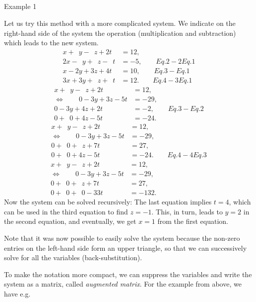 \documentclass[
  letterpaper,
  DIV=11,
  numbers=noendperiod]{scrartcl}
\makeatletter
\let\oldsubparagraph\subparagraph
\renewcommand{\subparagraph}{
    \@ifstar
      \xxxSubParagraphStar
      \xxxSubParagraphNoStar
  }
\newcommand{\xxxSubParagraphStar}[1]{\oldsubparagraph*{#1}\mbox{}}
\newcommand{\xxxSubParagraphNoStar}[1]{\oldsubparagraph{#1}\mbox{}}
\theoremstyle{remark}
\makeatother
\begin{document}
\subparagraph{Example 1}\label{example-1-1}

Let us try this method with a more complicated system. We indicate on
the right-hand side of the system the operation (multiplication and
subtraction) which leads to the new system. \[\begin{aligned}
 x+\phantom{2}y-\phantom{2}z+2t &= 12,\\
 2x-\phantom{2}y+\phantom{2}z-\phantom{2}t &=-5,    \qquad Eq. 2- 2 Eq. 1\\
 x-2y+3z+4t &= 10, \qquad Eq. 3-  Eq. 1\\ 
 3x+3y+\phantom{2}z+\phantom{2}t &= 12. \qquad Eq. 4- 3 Eq. 1
\end{aligned}\] \[\begin{aligned}
 x+\phantom{2}y-\phantom{2}z+2t &= 12,\\
\Leftrightarrow \qquad  0 - 3 y +3 z- 5 t &=-29,    \qquad  \\
 0-3y+4z+2t &= -2, \qquad Eq. 3-  Eq. 2\\ 
 0+\phantom{2}0 +4 z -5 t &= -24. 
\end{aligned}\] \[\begin{aligned}
 x+\phantom{2}y-\phantom{2}z+2t &= 12,\\
\Leftrightarrow \qquad  0 - 3 y +3 z- 5 t &=-29,    \qquad  \\
 0 + \phantom{2}0 + \phantom{1} z+7t &= 27,\\ 
 0+\phantom{2}0 +4 z -5 t &= -24.  \qquad  Eq.4- 4 Eq. 3
\end{aligned}\] \[\begin{aligned}
 x+\phantom{2}y-\phantom{2}z+2t &= 12,\\
\Leftrightarrow \qquad   0 - 3 y +3 z- 5 t &=-29,    \qquad  \phantom{Eq.4- 4 Eq. 3} \\
 0 + \phantom{2}0 + \phantom{1} z+7t &= 27,\\ 
 0+\phantom{2}0 + \phantom{2}0  -33 t &= -132.  
\end{aligned}\] Now the system can be solved recursively: The last
equation implies \(t=4\), which can be used in the third equation to
find \(z=-1\). This, in turn, leads to \(y=2\) in the second equation,
and eventually, we get \(x=1\) from the first equation.

Note that it was now possible to easily solve the system because the
non-zero entries on the left-hand side form an upper triangle, so that
we can successively solve for all the variables (back-substitution).

To make the notation more compact, we can suppress the variables and
write the system as a matrix, called \emph{augmented matrix}. For the
example from above, we have e.g.~
\end{document}
